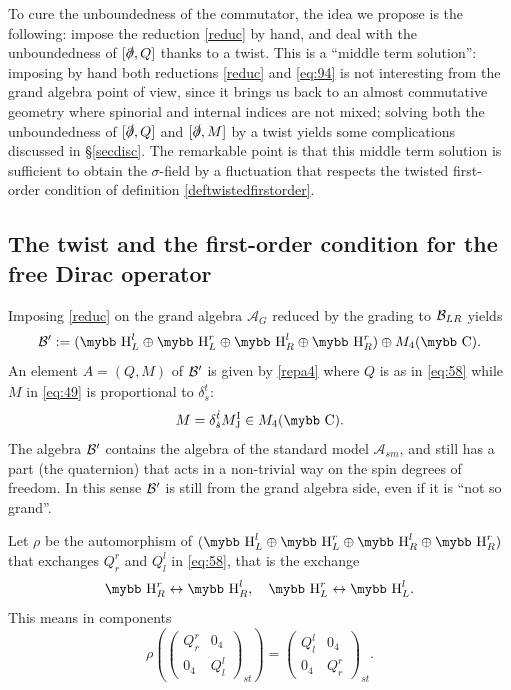 \documentclass[11pt]{article}
\newcommand{\A}{\mathcal A}
\newcommand{\ds}{\slashed \partial}
\def\bb#1{\hbox{\mybb#1}}
\newcommand{\sI}{\mathrm  I}
\newcommand{\sJ}{\mathrm J}
\begin{document}
To cure the unboundedness of the  commutator,  the idea we propose 
is the following: impose the reduction
\eqref{reduc} by hand, and deal with the unboundedness of $[\ds, Q]$
thanks to a twist.  This is a ``middle term
solution'': imposing by hand both reductions \eqref{reduc} and \eqref{eq:94}
is not interesting from the grand algebra point of view, since it brings
us back to an almost commutative geometry where spinorial and internal
indices are not mixed; solving both the unboundedness of $[\ds, Q]$ and
$[\ds, M]$ by a twist yields some complications discussed in \S\ref{secdisc}. The
remarkable point is that this middle term solution is sufficient to obtain the
$\sigma$-field by a fluctuation that respects the twisted first-order
condition of definition \ref{deftwistedfirstorder}.

\subsection{The twist and the first-order condition
  for the free Dirac operator}
\label{subsec:twistedfirtsfree}

Imposing \eqref{reduc} on the grand algebra $\A_G$ reduced
by the grading to ${\cal B}_{LR}$ yields
\begin{equation}
  \label{eq:87}
  {\cal B}' := (\bb H^l_L \oplus \bb H^r_L \oplus \bb H^l_R \oplus \bb H^r_R) \oplus
M_4(\bb C).
\end{equation}
An element
$A=(Q,M)$ of $\cal B'$ is given by \eqref{repa4} where $Q$ is as in \eqref{eq:58} while 
$M$ in \eqref{eq:49} is proportional to $\delta_{\dot s}^{\dot t}$:
\begin{equation}
  \label{eq:92}
  M= \delta_{\dot s}^{\dot t} M^\sI_\sJ \in M_4(\bb C).
\end{equation}
The algebra $\cal B'$ contains the algebra of
the standard model $\A_{sm}$, and still has a part (the quaternion)
that acts in a non-trivial way on the spin degrees of freedom. In this sense $\cal B'$ is still from the
grand algebra side, even if it is ``not so grand''.

\medskip Let $\rho$ be the automorphism of $(\bb H^l_L \oplus \bb H^r_L \oplus \bb H^l_R \oplus \bb H^r_R)$  that
exchanges $Q^r_r$ and $Q^l_l$ in \eqref{eq:58},  that is the exchange
\begin{equation}
\bb H^r_R \leftrightarrow \bb H^l_R,\quad \bb H^r_L
\leftrightarrow\bb H^l_L.\label{eq:12402}
\end{equation}
This means in components
 \begin{equation}
 \label{eq:5800}
 \rho\left(
   \left( 
     \begin{array}{cc}
       Q^r_r & 0_4 \\ 
       0_4 & Q^l_l
     \end{array}\right)_{st}\right) 
 = \left( 
   \begin{array}{cc}
     Q^l_l & 0_4 \\ 
     0_4 & Q^r_r
   \end{array}
 \right)_{st}.
 \end{equation}
\end{document}
